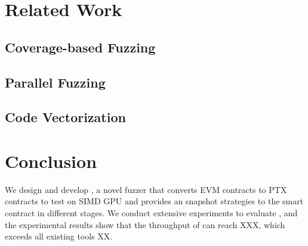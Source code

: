 \section{Related Work}

\subsection{Coverage-based Fuzzing}

\subsection{Parallel Fuzzing}

\subsection{Code Vectorization}

\section{Conclusion}
We design and develop {\tool}, a novel fuzzer that converts EVM contracts to PTX contracts to test on SIMD GPU and provides an snapshot strategies to the smart contract in different stages. 
%
We conduct extensive experiments to evaluate {\tool}, and the experimental results show that the throughput of {\tool} can reach XXX, which exceeds all existing tools XX.
